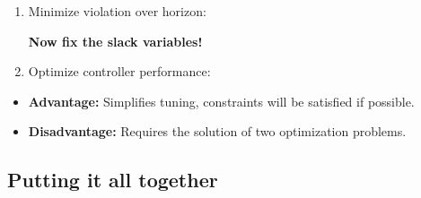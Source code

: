 \documentclass[8pt,a4paper]{scrartcl}
\begin{document}
\begin{multicols*}{3}
\begin{enumerate}
\ncompaq
\item Minimize violation over horizon:

\textbf{Now fix the slack variables!}

\item Optimize controller performance:
\end{enumerate}

\begin{itemize}
\ncompaq
\item \textbf{Advantage: }Simplifies tuning, constraints will be satisfied if possible.
\item \textbf{Disadvantage: }Requires the solution of two optimization problems.
\end{itemize}

\subsection{Putting it all together}


\end{multicols*}
\end{document}
